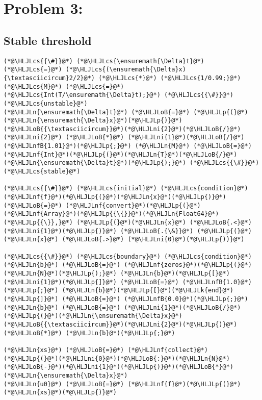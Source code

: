 \documentclass[12pt,a4paper]{article}
\newcommand{\HLJLk}[1]{\textcolor[RGB]{148,91,176}{\textbf{#1}}}
\newcommand{\HLJLn}[1]{#1}
\newcommand{\HLJLnf}[1]{\textcolor[RGB]{66,102,213}{#1}}
\newcommand{\HLJLnfB}[1]{\textcolor[RGB]{59,151,46}{#1}}
\newcommand{\HLJLni}[1]{\textcolor[RGB]{59,151,46}{#1}}
\newcommand{\HLJLoB}[1]{\textcolor[RGB]{102,102,102}{\textbf{#1}}}
\newcommand{\HLJLp}[1]{#1}
\newcommand{\HLJLcs}[1]{\textcolor[RGB]{153,153,119}{\textit{#1}}}
\begin{document}
\section{Problem 3:}
\subsection{Stable threshold}

\begin{lstlisting}
(*@\HLJLcs{{\#}}@*) (*@\HLJLcs{\ensuremath{\Delta}t}@*) (*@\HLJLcs{=}@*) (*@\HLJLcs{(\ensuremath{\Delta}x){\textasciicircum}2/2}@*) (*@\HLJLcs{*}@*) (*@\HLJLcs{1/0.99;}@*) (*@\HLJLcs{M}@*) (*@\HLJLcs{=}@*) (*@\HLJLcs{Int(T/\ensuremath{\Delta}t);}@*) (*@\HLJLcs{{\#}}@*) (*@\HLJLcs{unstable}@*)
(*@\HLJLn{\ensuremath{\Delta}t}@*) (*@\HLJLoB{=}@*) (*@\HLJLp{(}@*)(*@\HLJLn{\ensuremath{\Delta}x}@*)(*@\HLJLp{)}@*)(*@\HLJLoB{{\textasciicircum}}@*)(*@\HLJLni{2}@*)(*@\HLJLoB{/}@*)(*@\HLJLni{2}@*) (*@\HLJLoB{*}@*) (*@\HLJLni{1}@*)(*@\HLJLoB{/}@*)(*@\HLJLnfB{1.01}@*)(*@\HLJLp{;}@*) (*@\HLJLn{M}@*) (*@\HLJLoB{=}@*) (*@\HLJLnf{Int}@*)(*@\HLJLp{(}@*)(*@\HLJLn{T}@*)(*@\HLJLoB{/}@*)(*@\HLJLn{\ensuremath{\Delta}t}@*)(*@\HLJLp{);}@*) (*@\HLJLcs{{\#}}@*) (*@\HLJLcs{stable}@*)

(*@\HLJLcs{{\#}}@*) (*@\HLJLcs{initial}@*) (*@\HLJLcs{condition}@*)
(*@\HLJLnf{f}@*)(*@\HLJLp{(}@*)(*@\HLJLn{x}@*)(*@\HLJLp{)}@*) (*@\HLJLoB{=}@*) (*@\HLJLnf{convert}@*)(*@\HLJLp{(}@*)(*@\HLJLnf{Array}@*)(*@\HLJLp{{\{}}@*)(*@\HLJLn{Float64}@*)(*@\HLJLp{{\}},}@*) (*@\HLJLp{(}@*)(*@\HLJLn{x}@*) (*@\HLJLoB{.<}@*) (*@\HLJLni{1}@*)(*@\HLJLp{)}@*) (*@\HLJLoB{.{\&}}@*) (*@\HLJLp{(}@*)(*@\HLJLn{x}@*) (*@\HLJLoB{.>}@*) (*@\HLJLni{0}@*)(*@\HLJLp{))}@*)

(*@\HLJLcs{{\#}}@*) (*@\HLJLcs{boundary}@*) (*@\HLJLcs{condition}@*)
(*@\HLJLn{b}@*) (*@\HLJLoB{=}@*) (*@\HLJLnf{zeros}@*)(*@\HLJLp{(}@*)(*@\HLJLn{N}@*)(*@\HLJLp{);}@*) (*@\HLJLn{b}@*)(*@\HLJLp{[}@*)(*@\HLJLni{1}@*)(*@\HLJLp{]}@*) (*@\HLJLoB{=}@*) (*@\HLJLnfB{1.0}@*)(*@\HLJLp{;}@*) (*@\HLJLn{b}@*)(*@\HLJLp{[}@*)(*@\HLJLk{end}@*)(*@\HLJLp{]}@*) (*@\HLJLoB{=}@*) (*@\HLJLnfB{0.0}@*)(*@\HLJLp{;}@*) (*@\HLJLn{b}@*) (*@\HLJLoB{=}@*) (*@\HLJLni{1}@*)(*@\HLJLoB{/}@*)(*@\HLJLp{(}@*)(*@\HLJLn{\ensuremath{\Delta}x}@*)(*@\HLJLoB{{\textasciicircum}}@*)(*@\HLJLni{2}@*)(*@\HLJLp{)}@*) (*@\HLJLoB{*}@*) (*@\HLJLn{b}@*)(*@\HLJLp{;}@*)

(*@\HLJLn{xs}@*) (*@\HLJLoB{=}@*) (*@\HLJLnf{collect}@*)(*@\HLJLp{(}@*)(*@\HLJLni{0}@*)(*@\HLJLoB{:}@*)(*@\HLJLn{N}@*)(*@\HLJLoB{-}@*)(*@\HLJLni{1}@*)(*@\HLJLp{)}@*)(*@\HLJLoB{*}@*)(*@\HLJLn{\ensuremath{\Delta}x}@*)
(*@\HLJLn{u0}@*) (*@\HLJLoB{=}@*) (*@\HLJLnf{f}@*)(*@\HLJLp{(}@*)(*@\HLJLn{xs}@*)(*@\HLJLp{)}@*)


\end{lstlisting}
\end{document}
